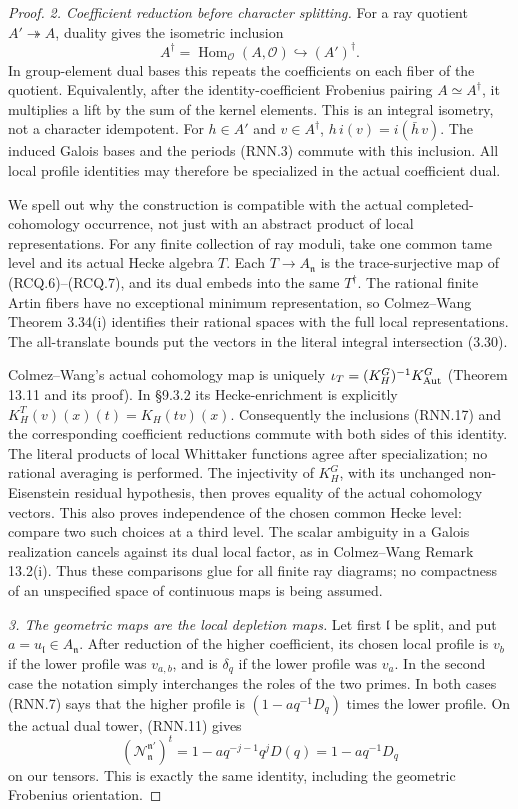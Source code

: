 \begin{proof}
\emph{2. Coefficient reduction before character splitting.}
For a ray quotient \(A'\twoheadrightarrow A\), duality gives
the isometric inclusion
\[
 A^\dagger=\operatorname{Hom}_{\mathcal O}(A,\mathcal O)
           \hookrightarrow
 (A')^\dagger.
 \tag{RNN.17}
\]
In group-element dual bases this repeats the coefficients
on each fiber of the quotient.  Equivalently, after the
identity-coefficient Frobenius pairing \(A\simeq A^\dagger\),
it multiplies a lift by the sum of the kernel elements.
This is an integral isometry, not a character idempotent.
For \(h\in A'\) and \(v\in A^\dagger\),
\(h\,i(v)=i(\bar h\,v)\).
The induced Galois bases and the periods (RNN.3) commute
with this inclusion.  All local profile identities may
therefore be specialized in the actual coefficient dual.

We spell out why the construction is compatible with the
actual completed-cohomology occurrence, not just with an
abstract product of local representations.
For any finite collection of ray moduli, take one common
tame level and its actual Hecke algebra \(T\).
Each \(T\to A_{\mathfrak n}\) is the trace-surjective map
of (RCQ.6)--(RCQ.7), and its dual embeds into the same
\(T^\dagger\).
The rational finite Artin fibers have no exceptional
minimum representation, so Colmez--Wang Theorem 3.34(i)
identifies their rational spaces with the full local
representations.  The all-translate bounds put the
vectors in the literal integral intersection (3.30).

Colmez--Wang's actual cohomology map is uniquely
\(\iota_T=(K_H^G)^{-1}K_{\rm Aut}^G\)
(Theorem 13.11 and its proof).  In \S9.3.2 its
Hecke-enrichment is explicitly
\(K_H^T(v)(x)(t)=K_H(tv)(x)\).
Consequently the inclusions (RNN.17) and the corresponding
coefficient reductions commute with both sides of this
identity.  The literal products of local Whittaker
functions agree after specialization; no rational
averaging is performed.
The injectivity of \(K_H^G\), with its unchanged
non-Eisenstein residual hypothesis, then proves equality
of the actual cohomology vectors.
This also proves independence of the chosen common
Hecke level: compare two such choices at a third level.
The scalar ambiguity in a Galois realization cancels
against its dual local factor, as in Colmez--Wang
Remark 13.2(i).  Thus these comparisons glue for all
finite ray diagrams; no compactness of an unspecified
space of continuous maps is being assumed.

\emph{3. The geometric maps are the local depletion maps.}
Let first \(\mathfrak l\) be split, and put
\(a=u_{\mathfrak l}\in A_{\mathfrak n}\).
After reduction of the higher coefficient, its chosen
local profile is \(v_b\) if the lower profile was
\(v_{a,b}\), and is \(\delta_q\) if the lower profile was
\(v_a\).  In the second case the notation simply
interchanges the roles of the two primes.
In both cases (RNN.7) says that the higher profile is
\((1-aq^{-1}D_q)\) times the lower profile.
On the actual dual tower, (RNN.11) gives
\[
 (\mathcal N_{\mathfrak n}^{\mathfrak n'})^t
       =1-aq^{-j-1}q^jD(q)
       =1-aq^{-1}D_q
 \tag{RNN.18}
\]
on our tensors.  This is exactly the same identity,
including the geometric Frobenius orientation.


\end{proof}
